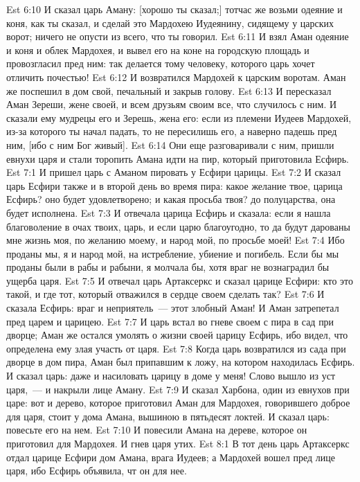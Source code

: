 \vs Est 6:10 И сказал царь Аману: [хорошо ты сказал;] тотчас же возьми одеяние и коня, как ты сказал, и сделай это Мардохею Иудеянину, сидящему у царских ворот; ничего не опусти из всего, что ты говорил.
\vs Est 6:11 И взял Аман одеяние и коня и облек Мардохея, и вывел его на коне на городскую площадь и провозгласил пред ним: так делается тому человеку, которого царь хочет отличить почестью!
\vs Est 6:12 И возвратился Мардохей к царским воротам. Аман же поспешил в дом свой, печальный и закрыв голову.
\vs Est 6:13 И пересказал Аман Зереши, жене своей, и всем друзьям своим все, что случилось с ним. И сказали ему мудрецы его и Зерешь, жена его: если из племени Иудеев Мардохей, из-за которого ты начал падать, то не пересилишь его, а наверно падешь пред ним, [ибо с ним Бог живый].
\vs Est 6:14 Они еще разговаривали с ним,  пришли евнухи царя и стали торопить Амана идти на пир, который приготовила Есфирь.
\vs Est 7:1 И пришел царь с Аманом пировать у Есфири царицы.
\vs Est 7:2 И сказал царь Есфири также и в  второй день во время пира: какое желание твое, царица Есфирь? оно будет удовлетворено; и какая просьба твоя?  до полуцарства, она будет исполнена.
\vs Est 7:3 И отвечала царица Есфирь и сказала: если я нашла благоволение в очах твоих, царь, и если царю благоугодно, то да будут дарованы мне жизнь моя, по желанию моему, и народ мой, по просьбе моей!
\vs Est 7:4 Ибо проданы мы, я и народ мой, на истребление, убиение и погибель. Если бы мы проданы были в рабы и рабыни, я молчала бы, хотя враг не вознаградил бы ущерба царя.
\vs Est 7:5 И отвечал царь Артаксеркс и сказал царице Есфири: кто это такой, и где тот, который отважился в сердце своем сделать так?
\vs Est 7:6 И сказала Есфирь: враг и неприятель~--- этот злобный Аман! И Аман затрепетал пред царем и царицею.
\vs Est 7:7 И царь встал во гневе своем с пира  в сад при дворце; Аман же остался умолять о жизни своей царицу Есфирь, ибо видел, что определена ему злая участь от царя.
\vs Est 7:8 Когда царь возвратился из сада при дворце в дом пира, Аман был припавшим к ложу, на котором находилась Есфирь. И сказал царь: даже и насиловать царицу  в доме у меня! Слово вышло из уст царя,~--- и накрыли лице Аману.
\vs Est 7:9 И сказал Харбона, один из евнухов при царе: вот и дерево, которое приготовил Аман для Мардохея, говорившего доброе для царя, стоит у дома Амана, вышиною в пятьдесят локтей. И сказал царь: повесьте его на нем.
\vs Est 7:10 И повесили Амана на дереве, которое он приготовил для Мардохея. И гнев царя утих.
\vs Est 8:1 В тот день царь Артаксеркс отдал царице Есфири дом Амана, врага Иудеев; а Мардохей вошел пред лице царя, ибо Есфирь объявила, чт он для нее.
